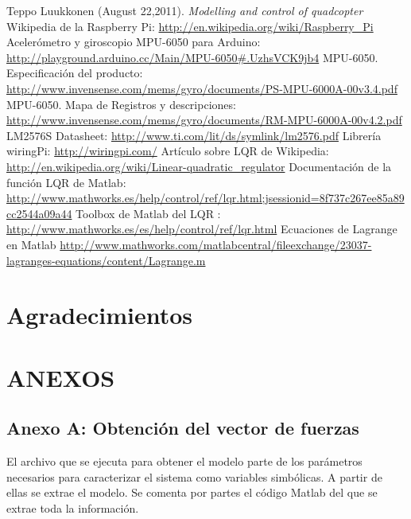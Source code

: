 \documentclass[twoside,11pt]{report}
\begin{document}
\newpage

\begin{thebibliography}{99}
 Teppo Luukkonen (August 22,2011). \textit{Modelling and control of quadcopter}
 Wikipedia de la Raspberry Pi: \url{http://en.wikipedia.org/wiki/Raspberry_Pi}
 Acelerómetro y giroscopio MPU-6050 para Arduino: \url{http://playground.arduino.cc/Main/MPU-6050#.UzhsVCK9jb4}
 MPU-6050. Especificación del producto: \url{http://www.invensense.com/mems/gyro/documents/PS-MPU-6000A-00v3.4.pdf}
 MPU-6050. Mapa de Registros y descripciones: \url{http://www.invensense.com/mems/gyro/documents/RM-MPU-6000A-00v4.2.pdf}
 LM2576S Datasheet: \url{http://www.ti.com/lit/ds/symlink/lm2576.pdf}
 Librería wiringPi: \url{http://wiringpi.com/}
 Artículo sobre LQR de Wikipedia: \url{http://en.wikipedia.org/wiki/Linear-quadratic_regulator}
 Documentación de la función LQR de Matlab: \url{http://www.mathworks.es/help/control/ref/lqr.html;jsessionid=8f737c267ee85a89cc2544a09a44}
 Toolbox de Matlab del LQR : \url{http://www.mathworks.es/es/help/control/ref/lqr.html}
 Ecuaciones de Lagrange en Matlab \url{http://www.mathworks.com/matlabcentral/fileexchange/23037-lagranges-equations/content/Lagrange.m}
\end{thebibliography}{}

\newpage

\chapter*{Agradecimientos}

\newpage

\chapter*{ANEXOS}
\section*{Anexo A: Obtención del vector de fuerzas}

El archivo que se ejecuta para obtener el modelo parte de los parámetros necesarios para caracterizar el sistema como variables simbólicas. A partir de ellas se extrae el modelo. Se comenta por partes el código Matlab del que se extrae toda la información. \\
\end{document}
